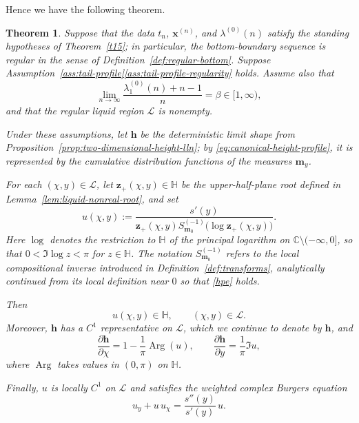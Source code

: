 \documentclass[11pt]{amsart}
\theoremstyle{plain}
\newtheorem{theorem}{Theorem}
\numberwithin{equation}{section}
\numberwithin{theorem}{section}
\numberwithin{figure}{section}
\begin{document}
Hence we have the following theorem.
\begin{theorem}
\label{thm:m31}
Suppose that the data $t_n$, $\mathbf x^{(n)}$, and
$\lambda^{(0)}(n)$ satisfy the
standing hypotheses of Theorem~\ref{t15}; in particular, the
bottom-boundary sequence is regular in the sense of
Definition~\ref{def:regular-bottom}. Suppose
Assumption~\ref{ass:tail-profile}\ref{ass:tail-profile-regularity} holds. Assume also that
\[
    \lim_{n\to\infty}
    \frac{\lambda_1^{(0)}(n)+n-1}{n}
    =
    \beta
    \in[1,\infty),
\]
and that the regular liquid region $\mathcal L$ is nonempty.


Under these assumptions, let $\mathbf h$ be the deterministic limit
shape from Proposition~\ref{prop:two-dimensional-height-lln}; by
\eqref{eq:canonical-height-profile}, it is represented by the
cumulative distribution functions of the measures \(\mathbf m_y\).

For each $(\chi,y)\in\mathcal L$, let
$\mathbf z_+(\chi,y)\in\mathbb H$ be the upper-half-plane root
defined in Lemma~\ref{lem:liquid-nonreal-root}, and set
\begin{equation}
    u(\chi,y)
    :=
    \frac{s'(y)}{
        \mathbf z_+(\chi,y)
        S_{\mathbf m_0}^{(-1)}
        \bigl(\log\mathbf z_+(\chi,y)\bigr)
    }.
    \label{eq:weighted-complex-slope}
\end{equation}
Here $\log$ denotes the restriction to $\mathbb H$ of the principal
logarithm on $\mathbb C\setminus(-\infty,0]$, so that
$0<\Im\log z<\pi$ for $z\in\mathbb H$. The notation
$S_{\mathbf m_0}^{(-1)}$ refers to the local compositional inverse
introduced in Definition~\ref{def:transforms}, analytically continued
from its local definition near $0$ so that \eqref{hpe} holds.

Then
\[
    u(\chi,y)\in\mathbb H,
    \qquad
    (\chi,y)\in\mathcal L.
\]
Moreover, $\mathbf h$ has a $C^1$ representative on $\mathcal L$,
which we continue to denote by $\mathbf h$, and
\begin{equation}
    \frac{\partial\mathbf h}{\partial\chi}
    =
    1-\frac{1}{\pi}\operatorname{Arg}(u),
    \qquad
    \frac{\partial\mathbf h}{\partial y}
    =
    \frac{1}{\pi}\Im u,
    \label{s21}
\end{equation}
where $\operatorname{Arg}$ takes values in $(0,\pi)$ on
$\mathbb H$.

Finally, $u$ is locally $C^1$ on $\mathcal L$ and satisfies the
weighted complex Burgers equation
\begin{equation}
    u_y+u\,u_\chi
    =
    \frac{s''(y)}{s'(y)}\,u.
    \label{be-weighted}
\end{equation}
\end{theorem}
\end{document}

